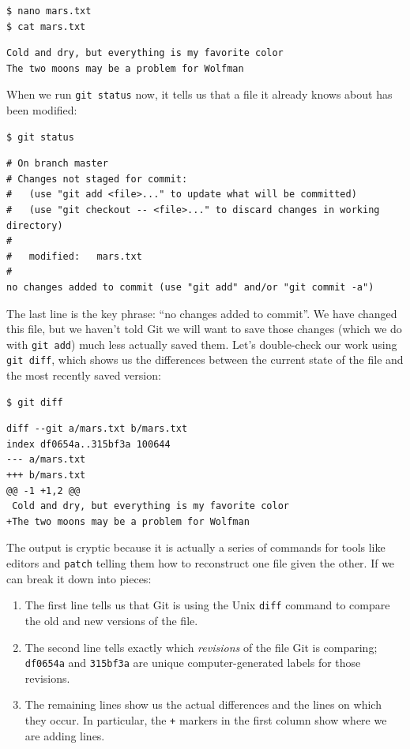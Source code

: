 \documentclass[]{book}
\newcommand{\gdef}[2]{\emph{#2}}
\begin{document}
\begin{verbatim}
$ nano mars.txt
$ cat mars.txt
\end{verbatim}

\begin{verbatim}
Cold and dry, but everything is my favorite color
The two moons may be a problem for Wolfman
\end{verbatim}

When we run \texttt{git status} now, it tells us that a file it already
knows about has been modified:

\begin{verbatim}
$ git status
\end{verbatim}

\begin{verbatim}
# On branch master
# Changes not staged for commit:
#   (use "git add <file>..." to update what will be committed)
#   (use "git checkout -- <file>..." to discard changes in working directory)
#
#   modified:   mars.txt
#
no changes added to commit (use "git add" and/or "git commit -a")
\end{verbatim}

The last line is the key phrase: ``no changes added to commit''. We have
changed this file, but we haven't told Git we will want to save those
changes (which we do with \texttt{git add}) much less actually saved
them. Let's double-check our work using \texttt{git diff}, which shows
us the differences between the current state of the file and the most
recently saved version:

\begin{verbatim}
$ git diff
\end{verbatim}

\begin{verbatim}
diff --git a/mars.txt b/mars.txt
index df0654a..315bf3a 100644
--- a/mars.txt
+++ b/mars.txt
@@ -1 +1,2 @@
 Cold and dry, but everything is my favorite color
+The two moons may be a problem for Wolfman
\end{verbatim}

The output is cryptic because it is actually a series of commands for
tools like editors and \texttt{patch} telling them how to reconstruct
one file given the other. If we can break it down into pieces:

\begin{enumerate}
\item
  The first line tells us that Git is using the Unix \texttt{diff}
  command to compare the old and new versions of the file.
\item
  The second line tells exactly which \gdef{g:revision}{revisions}
  of the file Git is comparing; \texttt{df0654a} and \texttt{315bf3a}
  are unique computer-generated labels for those revisions.
\item
  The remaining lines show us the actual differences and the lines on
  which they occur. In particular, the \texttt{+} markers in the first
  column show where we are adding lines.
\end{enumerate}
\end{document}
